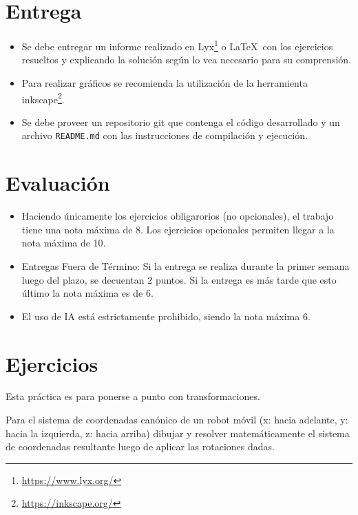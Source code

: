 \documentclass[tp]{lcc}
\begin{document}
\maketitle

\section{Entrega}
\begin{itemize}
    \item Se debe entregar un informe realizado en Lyx\footnote{\url{https://www.lyx.org/}} o \LaTeX\ con los ejercicios resueltos y explicando la solución según lo vea necesario para su comprensión.
    
    \item Para realizar gráficos se recomienda la utilización de la herramienta inkscape\footnote{\url{https://inkscape.org/}}.
    
    \item Se debe proveer un repositorio git que contenga el código desarrollado y un archivo \lstinline{README.md} con las instrucciones de compilación y ejecución.
\end{itemize}

\section{Evaluación}
\begin{itemize}
    \item Haciendo únicamente los ejercicios obligarorios (no opcionales), el trabajo tiene una nota máxima de 8. Los ejercicios opcionales permiten llegar a la nota máxima de 10.

    \item Entregas Fuera de Término: Si la entrega se realiza durante la primer semana luego del plazo, se decuentan 2 puntos. Si la entrega es más tarde que esto último la nota máxima es de 6.

    \item El uso de IA está estrictamente prohibido, siendo la nota máxima 6.
\end{itemize}

\section{Ejercicios}
Esta práctica es para ponerse a punto con transformaciones.

\ejercicio Para el sistema de coordenadas canónico de un robot móvil (x: hacia adelante, y: hacia la izquierda, z: hacia arriba) dibujar y resolver matemáticamente el sistema de coordenadas resultante luego de aplicar las rotaciones dadas.
\end{document}
